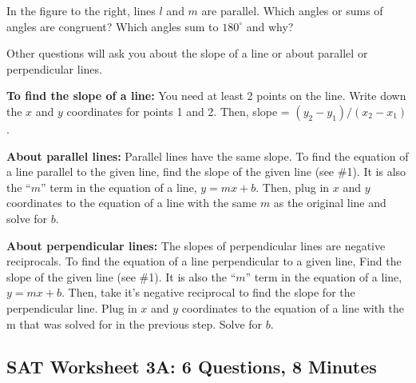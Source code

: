 \documentclass[12pt]{book}
\begin{document}
In the figure to the right, lines $l$ and $m$ are parallel. Which angles or sums of angles are congruent? Which angles sum to $180^\circ$ and why?

\begin{center}
\end{center}

Other questions will ask you about the slope of a line or about parallel or perpendicular lines.

\bigskip
\textbf{To find the slope of a line:} You need at least 2 points on the line. Write down the $x$ and $y$ coordinates for points 1 and 2. Then, slope = $(y_2-y_1)/(x_2-x_1)$.

\bigskip
\textbf{About parallel lines:} Parallel lines have the same slope. To find the equation of a line parallel to the given line, find the slope of the given line (see \#1). It is also the ``$m$'' term in the equation of a line, $y=mx+b$. Then, plug in $x$ and $y$ coordinates to the equation of a line with the same $m$ as the original line and solve for $b$.

\bigskip
\textbf{About perpendicular lines:} The slopes of perpendicular lines are negative reciprocals. To find the equation of a line perpendicular to a given line, Find the slope of the given line (see \#1). It is also the ``$m$'' term in the equation of a line, $y=mx+b$. Then, take it's negative reciprocal to find the slope for the perpendicular line. Plug in $x$ and $y$ coordinates to the equation of a line with the m that was solved for in the previous step. Solve for $b$.

\newpage
\subsection{SAT Worksheet 3A: 6 Questions, 8 Minutes}
\end{document}

